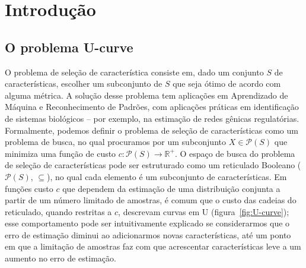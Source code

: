 \documentclass[12pt]{article}
\begin{document}
\section{Introdução}
% 
\subsection{O problema U-curve}
O problema de seleção de característica consiste em, dado um conjunto $S$
de características, escolher um subconjunto de $S$ que seja
ótimo de acordo com
alguma métrica. A solução desse problema tem aplicações em
Aprendizado de Máquina e Reconhecimento de Padrões, com aplicações práticas
em identificação de sistemas biológicos -- por exemplo, na estimação de redes
gênicas regulatórias. Formalmente, podemos 
definir o problema de seleção de características como um problema de 
busca, no qual procuramos por um subconjunto $X \in \mathcal{P}(S)$ que 
minimiza uma função de custo $c : \mathcal{P}(S) \to \mathbb{R^+}$.
O espaço de busca do problema de seleção de características pode ser
estruturado como um reticulado Booleano ($\mathcal{P}(S)$, $\subseteq$), no qual
cada elemento é um subconjunto de características. Em funções custo $c$ que dependem
da estimação de uma distribuição conjunta a partir de um número limitado de
amostras, é comum que o custo das cadeias do reticulado, quando restritas a $c$,
descrevam curvas em U (figura~\ref{fig:U-curve}); esse
comportamento pode ser intuitivamente explicado se considerarmos que o
erro de estimação diminui ao adicionarmos novas características, até um ponto
em que a limitação de amostras faz com que acrescentar características
leve a um aumento no erro de estimação.
\end{document}
